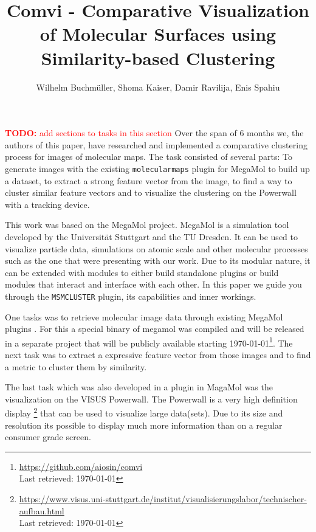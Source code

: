 \documentclass[journal]{vgtc}       %
\title{Comvi - Comparative Visualization of Molecular Surfaces using Similarity-based Clustering}
\author{Wilhelm Buchm\"uller, Shoma Kaiser, Damir Ravilija, Enis Spahiu}
\newcommand{\todo}[1]{\textcolor{red}{\textbf{TODO:} #1}}
\begin{document}

\label{sec:intro}
%
\maketitle
%
\todo{add sections to tasks in this section}%
Over the span of 6 months we, the authors of this paper,  have researched and implemented a comparative clustering  process for images of molecular maps.
The task consisted of several parts: To generate images with the existing \verb|molecularmaps| plugin for MegaMol \cite{MegaMol} to build up a dataset, to extract a strong feature vector from the image, to find a way to cluster similar feature vectors and to visualize the clustering on the Powerwall with a tracking device.

This work was based on the MegaMol\cite{MegaMol} project. MegaMol is a simulation tool developed by the Universit\"at Stuttgart and the TU Dresden. It can be used to visualize particle data, simulations on atomic scale and other molecular processes such as the one that were presenting with our work. 
Due to its modular nature, it can be extended with modules to either build standalone plugins or build modules that interact and interface with each other.
In this paper we guide you through the \verb|MSMCLUSTER| plugin, its capabilities and inner workings.

One tasks was to retrieve molecular image data through existing MegaMol plugins \cite{molecularmaps}. For this a special binary of megamol was compiled and will be released in a separate project that will be publicly available starting \today \footnote{\url{https://github.com/aiosin/comvi}\\ Last retrieved: \today}.
The next task was to extract a expressive feature vector from those images and to find a metric to cluster them by similarity.

The last task which was also developed in a plugin in MagaMol was the visualization on the VISUS Powerwall. The Powerwall is a very high definition display \footnote{\url{https://www.visus.uni-stuttgart.de/institut/visualisierungslabor/technischer-aufbau.html} \\ Last retrieved: \today } that can be used to visualize large data(sets). Due to its size and resolution its possible to display much more information than on a regular consumer grade screen. 
\end{document}
